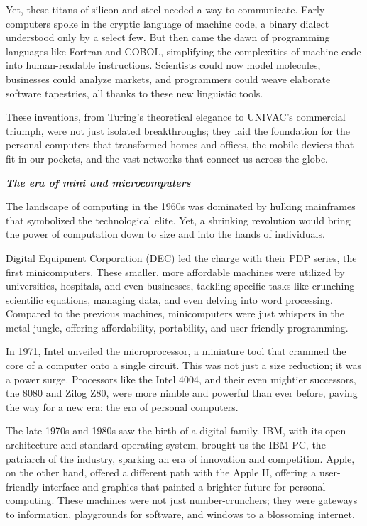 \documentclass[
  letterpaper,
  DIV=11,
  numbers=noendperiod]{scrreprt}
\begin{document}
Yet, these titans of silicon and steel needed a way to communicate.
Early computers spoke in the cryptic language of machine code, a binary
dialect understood only by a select few. But then came the dawn of
programming languages like Fortran and COBOL, simplifying the
complexities of machine code into human-readable instructions.
Scientists could now model molecules, businesses could analyze markets,
and programmers could weave elaborate software tapestries, all thanks to
these new linguistic tools.

These inventions, from Turing's theoretical elegance to UNIVAC's
commercial triumph, were not just isolated breakthroughs; they laid the
foundation for the personal computers that transformed homes and
offices, the mobile devices that fit in our pockets, and the vast
networks that connect us across the globe.

\textbf{\emph{The era of mini and microcomputers}}

The landscape of computing in the 1960s was dominated by hulking
mainframes that symbolized the technological elite. Yet, a shrinking
revolution would bring the power of computation down to size and into
the hands of individuals.

Digital Equipment Corporation (DEC) led the charge with their PDP
series, the first minicomputers. These smaller, more affordable machines
were utilized by universities, hospitals, and even businesses, tackling
specific tasks like crunching scientific equations, managing data, and
even delving into word processing. Compared to the previous machines,
minicomputers were just whispers in the metal jungle, offering
affordability, portability, and user-friendly programming.

In 1971, Intel unveiled the microprocessor, a miniature tool that
crammed the core of a computer onto a single circuit. This was not just
a size reduction; it was a power surge. Processors like the Intel 4004,
and their even mightier successors, the 8080 and Zilog Z80, were more
nimble and powerful than ever before, paving the way for a new era: the
era of personal computers.

The late 1970s and 1980s saw the birth of a digital family. IBM, with
its open architecture and standard operating system, brought us the IBM
PC, the patriarch of the industry, sparking an era of innovation and
competition. Apple, on the other hand, offered a different path with the
Apple II, offering a user-friendly interface and graphics that painted a
brighter future for personal computing. These machines were not just
number-crunchers; they were gateways to information, playgrounds for
software, and windows to a blossoming internet.
\end{document}
